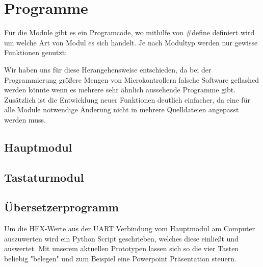 \section{Programme}
Für die Module gibt es ein Programcode, wo mithilfe von #define definiert wird um welche Art von Modul es sich handelt. Je nach Modultyp werden nur gewisse Funktionen genutzt:


Wir haben uns für diese Herangehensweise entschieden, da bei der Programmierung größere Mengen von Microkontrollern falsche Software geflashed werden könnte wenn es mehrere sehr ähnlich aussehende Programme gibt. Zusätzlich ist die Entwicklung neuer Funktionen deutlich einfacher, da eine für alle Module notwendige Änderung nicht in mehrere Quelldateien angepasst werden muss.


\subsection{Hauptmodul}


\subsection{Tastaturmodul}
\subsection{Übersetzerprogramm}
Um die HEX-Werte aus der UART Verbindung vom Hauptmodul am Computer auszuwerten wird ein Python Script geschrieben, welches diese einließt und auswertet. Mit unserem aktuellen Prototypen lassen sich so die vier Tasten beliebig "belegen" und zum Beispiel eine Powerpoint Präsentation steuern.





